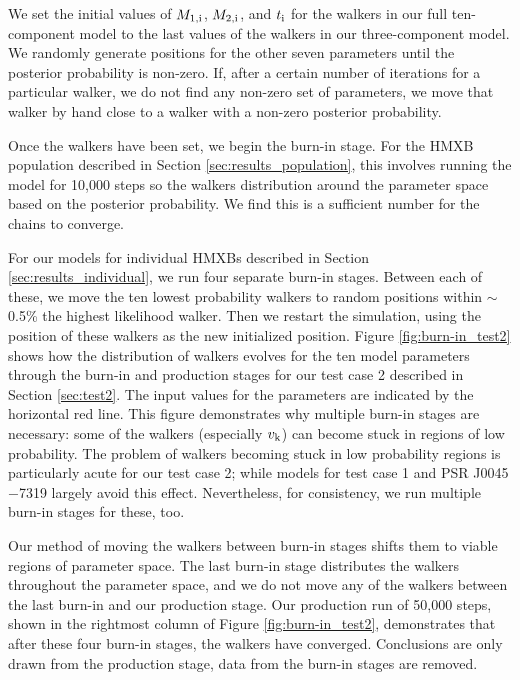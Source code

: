 \documentclass[usenatbib]{mnras}
\begin{document}
We set the initial values of $M_{\rm 1,i}$, $M_{\rm 2,i}$, and $t_{\rm i}$ for the walkers in our full ten-component model to the last values of the walkers in our three-component model. We randomly generate positions for the other seven parameters until the posterior probability is non-zero. If, after a certain number of iterations for a particular walker, we do not find any non-zero set of parameters, we move that walker by hand close to a walker with a non-zero posterior probability. 


Once the walkers have been set, we begin the burn-in stage. For the HMXB population described in Section \ref{sec:results_population}, this involves running the model for 10,000 steps so the walkers distribution around the parameter space based on the posterior probability. We find this is a sufficient number for the chains to converge. 


For our models for individual HMXBs described in Section \ref{sec:results_individual}, we run four separate burn-in stages. Between each of these, we move the ten lowest probability walkers to random positions within $\sim$0.5\% the highest likelihood walker. Then we restart the simulation, using the position of these walkers as the new initialized position. Figure \ref{fig:burn-in_test2} shows how the distribution of walkers evolves for the ten model parameters through the burn-in and production stages for our test case 2 described in Section \ref{sec:test2}. The input values for the parameters are indicated by the horizontal red line. This figure demonstrates why multiple burn-in stages are necessary: some of the walkers (especially $v_{\rm k}$) can become stuck in regions of low probability. The problem of walkers becoming stuck in low probability regions is particularly acute for our test case 2; while models for test case 1 and PSR J0045$-$7319 largely avoid this effect. Nevertheless, for consistency, we run multiple burn-in stages for these, too.


Our method of moving the walkers between burn-in stages shifts them to viable regions of parameter space. The last burn-in stage distributes the walkers throughout the parameter space, and we do not move any of the walkers between the last burn-in and our production stage. Our production run of 50,000 steps, shown in the rightmost column of Figure \ref{fig:burn-in_test2}, demonstrates that after these four burn-in stages, the walkers have converged. Conclusions are only drawn from the production stage, data from the burn-in stages are removed.


\label{lastpage}
\end{document}

